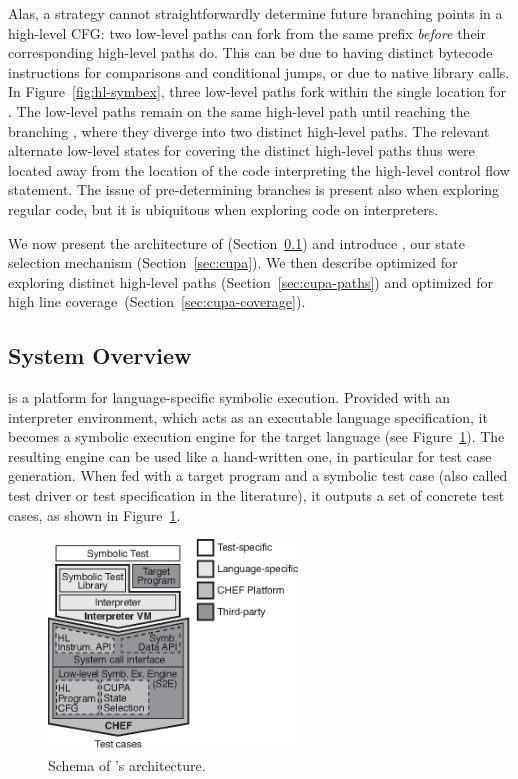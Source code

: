Alas, a strategy cannot straightforwardly determine future branching points in a high-level CFG: two low-level paths can fork from the same prefix \emph{before} their corresponding high-level paths do.  This can be due to having distinct bytecode instructions for comparisons and conditional jumps, or due to native library calls.  
%
In Figure~\ref{fig:hl-symbex}, three low-level paths fork within the single \hlpc location for . The low-level paths remain on the same high-level path until reaching the branching \hlpc, where they diverge into two distinct high-level paths. The relevant alternate low-level states for covering the distinct high-level paths thus were located away from the location of the code interpreting the high-level control flow statement.
%
The issue of pre-determining branches is present also when exploring regular code, but it is ubiquitous when exploring code on interpreters.



We now present the architecture of \chef (Section~\ref{sec:architecture}) and introduce \cupa, our state selection mechanism (Section~\ref{sec:cupa}). We then describe \cupa optimized for exploring distinct high-level paths (Section~\ref{sec:cupa-paths}) and optimized for high line coverage~(Section~\ref{sec:cupa-coverage}).

\subsection{System Overview}
\label{sec:architecture}

\chef is a platform for language-specific symbolic execution. Provided with an interpreter environment, which acts as an executable language specification, it becomes a symbolic execution engine for the target language (see Figure~\ref{fig:system-arch}).
%
The resulting engine can be used like a hand-written one, in particular for test case generation. When fed with a target program and a symbolic test case (also called test driver or test specification in the literature), it outputs a set of concrete test cases, as shown in Figure~\ref{fig:system-arch}.

\begin{figure}
  \centering
  \includegraphics[width=2.6in]{figures/chef/system-arch}
  \caption{Schema of \chef's architecture.}
  \label{fig:system-arch}
\end{figure}

